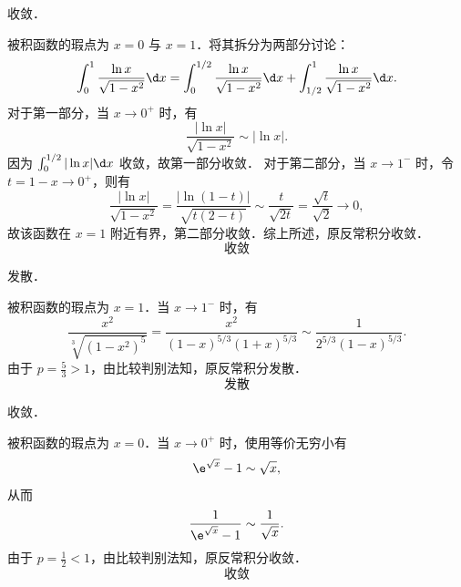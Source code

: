 \begin{solution}
     收敛．

    被积函数的瑕点为 $x = 0$ 与 $x = 1$．将其拆分为两部分讨论：
    \begin{equation}
        \int_0^1 \frac{\ln x}{\sqrt{1 - x^2}} \d x = \int_0^{1/2} \frac{\ln x}{\sqrt{1 - x^2}} \d x + \int_{1/2}^1 \frac{\ln x}{\sqrt{1 - x^2}} \d x.
    \end{equation}
    对于第一部分，当 $x \to 0^+$ 时，有
    \begin{equation}
        \frac{|\ln x|}{\sqrt{1 - x^2}} \sim |\ln x|.
    \end{equation}
    因为 $\int_0^{1/2} |\ln x| \d x$ 收敛，故第一部分收敛．
    对于第二部分，当 $x \to 1^-$ 时，令 $t = 1 - x \to 0^+$，则有
    \begin{equation}
        \frac{|\ln x|}{\sqrt{1 - x^2}} = \frac{|\ln(1 - t)|}{\sqrt{t(2 - t)}} \sim \frac{t}{\sqrt{2t}} = \frac{\sqrt{t}}{\sqrt{2}} \to 0,
    \end{equation}
    故该函数在 $x = 1$ 附近有界，第二部分收敛．综上所述，原反常积分收敛．
    \begin{equation}
        \boxed{\text{收敛}}
    \end{equation}

     发散．

    被积函数的瑕点为 $x = 1$．当 $x \to 1^-$ 时，有
    \begin{equation}
        \frac{x^2}{\sqrt[3]{(1 - x^2)^5}} = \frac{x^2}{(1 - x)^{5/3} (1 + x)^{5/3}} \sim \frac{1}{2^{5/3} (1 - x)^{5/3}}.
    \end{equation}
    由于 $p = \frac{5}{3} > 1$，由比较判别法知，原反常积分发散．
    \begin{equation}
        \boxed{\text{发散}}
    \end{equation}

     收敛．

    被积函数的瑕点为 $x = 0$．当 $x \to 0^+$ 时，使用等价无穷小有
    \begin{equation}
        \e^{\sqrt{x}} - 1 \sim \sqrt{x},
    \end{equation}
    从而
    \begin{equation}
        \frac{1}{\e^{\sqrt{x}} - 1} \sim \frac{1}{\sqrt{x}}.
    \end{equation}
    由于 $p = \frac{1}{2} < 1$，由比较判别法知，原反常积分收敛．
    \begin{equation}
        \boxed{\text{收敛}}
    \end{equation}


\end{solution}
